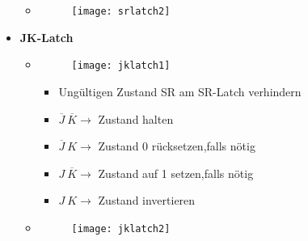 \begin{itemize}
\begin{itemize}
	\item[] \begin{figure}[H]
				\begin{center}
				\texttt{[image: srlatch2]}
				\end{center}
			\end{figure}
	\end{itemize}
	
\item \textbf{JK-Latch}
	\begin{itemize}
	\item[]		
				\begin{minipage}{0.25\textwidth}
					\begin{figure}[H]
					\texttt{[image: jklatch1]}
					\end{figure}
				\end{minipage}
				\begin{minipage}[t]{0.6\textwidth}
					\vspace{-1.25cm}
					\begin{itemize}
					\item Ungültigen Zustand SR am SR-Latch verhindern
					\item $\overline{J}~\overline{K} \rightarrow$ Zustand halten
					\item $\overline{J}~K \rightarrow$ Zustand 0 rücksetzen,falls nötig
					\item $J~\overline{K} \rightarrow$ Zustand auf 1 setzen,falls nötig
					\item $J~K \rightarrow$ Zustand invertieren
					\end{itemize}
				\end{minipage}
				
	\item[] \begin{figure}[H]
				\begin{center}
				\texttt{[image: jklatch2]}
				\end{center}
			\end{figure}
	\end{itemize}
	

\end{itemize}
